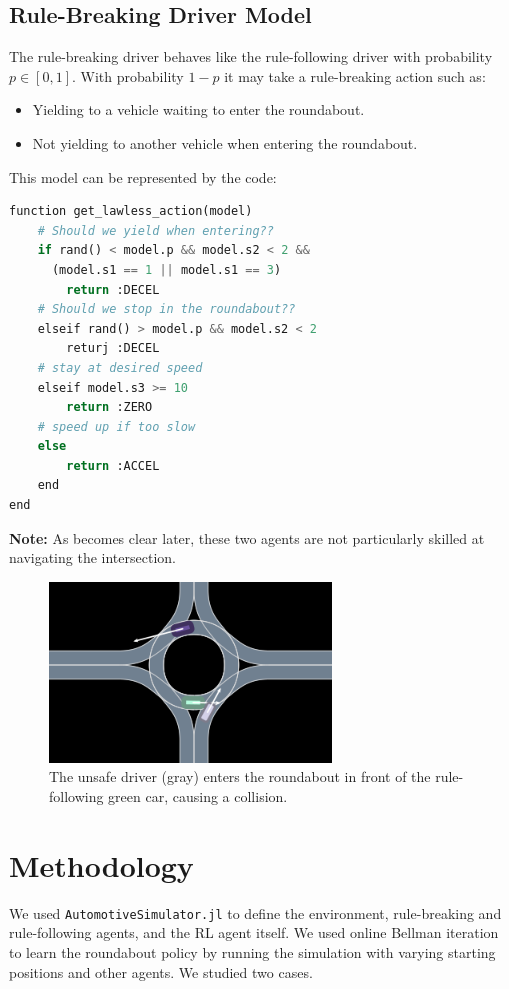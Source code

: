 \documentclass[conference]{IEEEtran}
\begin{document}
\subsection{Rule-Breaking Driver Model}
The rule-breaking driver behaves like the rule-following driver with probability $p \in [0,1]$. With probability $1-p$ it may take a rule-breaking action such as:
\begin{itemize}
	\item Yielding to a vehicle waiting to enter the roundabout.
	\item Not yielding to another vehicle when entering the roundabout.
\end{itemize}
This model can be represented by the code:
\begin{lstlisting}[language=python,caption={Rule-breaking driver model.}]
function get_lawless_action(model)
    # Should we yield when entering??
    if rand() < model.p && model.s2 < 2 &&
      (model.s1 == 1 || model.s1 == 3)
        return :DECEL
    # Should we stop in the roundabout??
    elseif rand() > model.p && model.s2 < 2
        returj :DECEL
    # stay at desired speed
    elseif model.s3 >= 10
        return :ZERO
    # speed up if too slow
    else
        return :ACCEL
    end
end
\end{lstlisting}

\textbf{Note:} As becomes clear later, these two agents are not particularly skilled at navigating the intersection.
\begin{figure}[h!]
	\centering
\includegraphics[width=0.7\linewidth]{figures/unsafe.png}
\caption{The unsafe driver (gray) enters the roundabout in front of the rule-following green car, causing a collision.}
\label{fig:unsafe}
\end{figure}

\section{Methodology}
We used \verb|AutomotiveSimulator.jl| \cite{simulator.jl} to define the environment, rule-breaking and rule-following agents, and the RL agent itself.
We used online Bellman iteration \cite{kochenderfer2022algorithmsch7} to learn the roundabout policy by running the simulation with varying starting positions and other agents.
We studied two cases.
\end{document}
